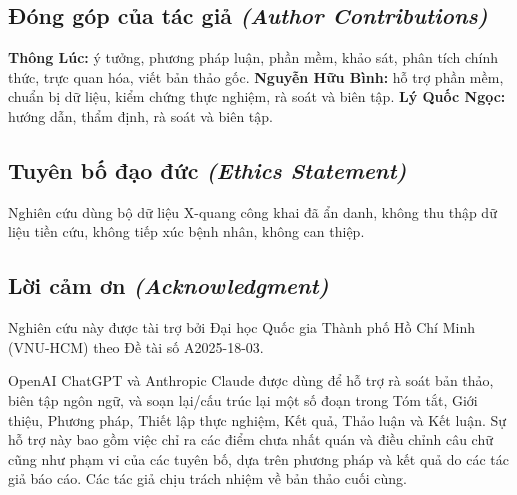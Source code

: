 \documentclass[11pt]{article}
\newcommand{\enlabel}[1]{{\small\itshape\color{gray} (#1)}}
\begin{document}
\subsection*{Đóng góp của tác giả \enlabel{Author Contributions}}
\textbf{Thông Lúc:} ý tưởng, phương pháp luận, phần mềm, khảo sát, phân tích chính thức, trực quan hóa, viết bản thảo gốc. \textbf{Nguyễn Hữu Bình:} hỗ trợ phần mềm, chuẩn bị dữ liệu, kiểm chứng thực nghiệm, rà soát và biên tập. \textbf{Lý Quốc Ngọc:} hướng dẫn, thẩm định, rà soát và biên tập.

\subsection*{Tuyên bố đạo đức \enlabel{Ethics Statement}}
Nghiên cứu dùng bộ dữ liệu X-quang công khai đã ẩn danh, không thu thập dữ liệu tiền cứu, không tiếp xúc bệnh nhân, không can thiệp.

\subsection*{Lời cảm ơn \enlabel{Acknowledgment}}
Nghiên cứu này được tài trợ bởi Đại học Quốc gia Thành phố Hồ Chí Minh (VNU-HCM) theo Đề tài số A2025-18-03.

OpenAI ChatGPT và Anthropic Claude được dùng để hỗ trợ rà soát bản thảo, biên tập ngôn ngữ, và soạn lại/cấu trúc lại một số đoạn trong Tóm tắt, Giới thiệu, Phương pháp, Thiết lập thực nghiệm, Kết quả, Thảo luận và Kết luận. Sự hỗ trợ này bao gồm việc chỉ ra các điểm chưa nhất quán và điều chỉnh câu chữ cũng như phạm vi của các tuyên bố, dựa trên phương pháp và kết quả do các tác giả báo cáo. Các tác giả chịu trách nhiệm về bản thảo cuối cùng.
\end{document}
